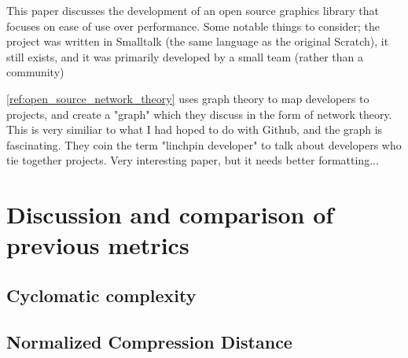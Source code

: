 \documentclass[]{article}
\begin{document}
This paper discusses the development of an open source graphics library that focuses on ease of use over performance.
Some notable things to consider; the project was written in Smalltalk (the same language as the original Scratch), it still exists, and it was primarily developed by a small team (rather than a community)


\ref{ref:open_source_network_theory} uses graph theory to map developers to projects, and create a "graph" which they discuss in the form of network theory.
This is very similiar to what I had hoped to do with Github, and the graph is fascinating.
They coin the term "linchpin developer" to talk about developers who tie together projects.
Very interesting paper, but it needs better formatting...






\section{Discussion and comparison of previous metrics}


\subsection{Cyclomatic complexity}

\cite{ref:a_complexity_measure}

\subsection{Normalized Compression Distance}
\end{document}
